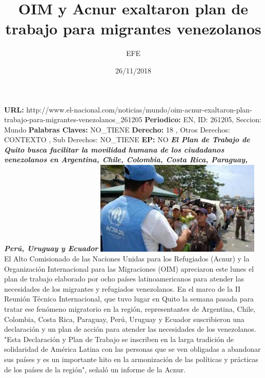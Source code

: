 \documentclass{article}%
\title{\textbf{OIM y Acnur exaltaron plan de trabajo para migrantes venezolanos}}%
\author{EFE}%
\date{26/11/2018}%
\begin{document}
%
\normalsize%
\maketitle%
\textbf{URL: }%
http://www.el{-}nacional.com/noticias/mundo/oim{-}acnur{-}exaltaron{-}plan{-}trabajo{-}para{-}migrantes{-}venezolanos\_261205\newline%
%
\textbf{Periodico: }%
EN, %
ID: %
261205, %
Seccion: %
Mundo\newline%
%
\textbf{Palabras Claves: }%
NO\_TIENE\newline%
%
\textbf{Derecho: }%
18%
, Otros Derechos: %
CONTEXTO%
, Sub Derechos: %
NO\_TIENE%
\newline%
%
\textbf{EP: }%
NO\newline%
\newline%
%
\textbf{\textit{El Plan de Trabajo de Quito busca facilitar la movilidad humana de los ciudadanos venezolanos en Argentina, Chile, Colombia, Costa Rica, Paraguay, Perú, Uruguay y Ecuador}}%
\newline%
\newline%
%
\includegraphics[width=300px]{99.jpg}%
\newline%
%
El Alto Comisionado de las Naciones Unidas para los Refugiados (Acnur) y la Organización Internacional para las Migraciones (OIM) apreciaron este lunes el plan de trabajo elaborado por ocho países latinoamericanos para atender las necesidades de los migrantes y refugiados venezolanos.%
\newline%
%
En el marco de la II Reunión Técnica Internacional, que tuvo lugar en Quito la semana pasada para tratar ese fenómeno migratorio en la región, representantes de Argentina, Chile, Colombia, Costa Rica, Paraguay, Perú, Uruguay y Ecuador suscribieron una declaración y un plan de acción para atender las necesidades de los venezolanos.%
\newline%
%
"Esta Declaración y Plan de Trabajo se inscriben en la larga tradición de solidaridad de América Latina con las personas que se ven obligadas a abandonar sus países y es un importante hito en la armonización de las políticas y prácticas de los países de la región", señaló un informe de la Acnur.%
\end{document}
